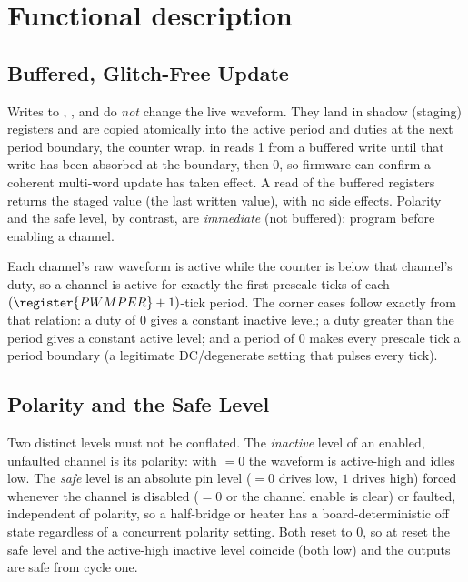 \section{Functional description}

\subsection{Buffered, Glitch-Free Update}

Writes to , , and  do \emph{not} change the live waveform. They land in shadow (staging) registers and are copied atomically into the active period and duties at the next period boundary, the counter wrap.  in  reads 1 from a buffered write until that write has been absorbed at the boundary, then 0, so firmware can confirm a coherent multi-word update has taken effect. A read of the buffered registers returns the staged value (the last written value), with no side effects. Polarity and the safe level, by contrast, are \emph{immediate} (not buffered): program  before enabling a channel.

Each channel's raw waveform is active while the counter is below that channel's duty, so a channel is active for exactly the first  prescale ticks of each $(\register{PWMPER}+1)$-tick period. The corner cases follow exactly from that relation: a duty of 0 gives a constant inactive level; a duty greater than the period gives a constant active level; and a period of 0 makes every prescale tick a period boundary (a legitimate DC/degenerate setting that pulses  every tick).

\subsection{Polarity and the Safe Level}

Two distinct levels must not be conflated. The \emph{inactive} level of an enabled, unfaulted channel is its polarity: with $=0$ the waveform is active-high and idles low. The \emph{safe} level is an absolute pin level ($=0$ drives low, $1$ drives high) forced whenever the channel is disabled ($=0$ or the channel enable is clear) or faulted, independent of polarity, so a half-bridge or heater has a board-deterministic off state regardless of a concurrent polarity setting. Both reset to 0, so at reset the safe level and the active-high inactive level coincide (both low) and the outputs are safe from cycle one.

